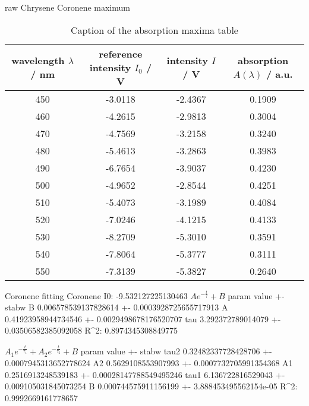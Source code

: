 raw Chrysene
Coronene maximum
\begin{table}[H]
\centering
\caption{Caption of the absorption maxima table}
\label{tab:Coronene_maximum}
\begin{tabular}{cccc}
\toprule
wavelength $\lambda$ / nm & reference intensity $I_0$ / V & intensity $I$ / V & absorption $A(\lambda)$ / a.u. \\
\midrule
\midrule
450 & -3.0118 & -2.4367 & 0.1909 \\
460 & -4.2615 & -2.9813 & 0.3004 \\
470 & -4.7569 & -3.2158 & 0.3240 \\
480 & -5.4613 & -3.2863 & 0.3983 \\
490 & -6.7654 & -3.9037 & 0.4230 \\
500 & -4.9652 & -2.8544 & 0.4251 \\
510 & -5.4073 & -3.1989 & 0.4084 \\
520 & -7.0246 & -4.1215 & 0.4133 \\
530 & -8.2709 & -5.3010 & 0.3591 \\
540 & -7.8064 & -5.3777 & 0.3111 \\
550 & -7.3139 & -5.3827 & 0.2640 \\
\bottomrule
\end{tabular}
\end{table}


Coronene fitting
Coronene I0:  -9.532127225130463
$A e^{- \frac{t}{\tau}} + B$
param value                +- stabw                 
B     0.006578539137828614 +- 0.0003928725655717913 
A     0.41923958944734546  +- 0.0029498678176520707 
tau   3.292372789014079    +- 0.03506582385092058   
R^2: 0.8974345308849775

$A_{1} e^{- \frac{t}{\tau_{1}}} + A_{2} e^{- \frac{t}{\tau_{2}}} + B$
param value                +- stabw                  
tau2  0.32482337728428706  +- 0.0007945313652778624  
A2    0.5629108553907993   +- 0.0007732705991354368  
A1    0.2516913248539183   +- 0.00028147788549495246 
tau1  6.136722816529043    +- 0.009105031845073254   
B     0.000744575911156199 +- 3.888453495562154e-05  
R^2: 0.9992669161778657


